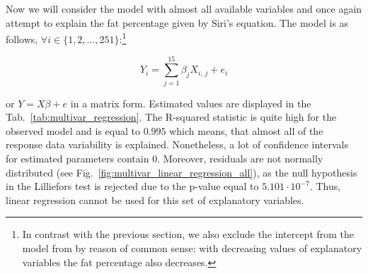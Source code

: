 \documentclass[11pt,american,american]{article}
\begin{document}
Now we will consider the model with almost all available variables and once again attempt to explain the fat percentage given by Siri's equation. The model is as follows, $\forall i \in \{1,2, \dots, 251\}$:\footnote{In contrast with the previous section, we also exclude the intercept from the model from by reason of common sense: with decreasing values of explanatory variables the fat percentage also decreases.}

\begin{equation}
	Y_{i} = \sum_{j = 1}^{15}\beta_{j} X_{i,\,j} + e_{i}
\end{equation}

\medskip
\noindent
or $Y = X \beta + e$ in a matrix form. Estimated values are displayed in the Tab.~\ref{tab:multivar_regression}. The R-squared statistic is quite high for the observed model and is equal to $0.995$ which means, that almost all of the response data variability is explained. Nonetheless, a lot of confidence intervals for estimated parameters contain $0$. Moreover, residuals are not normally distributed (see Fig.~\ref{fig:multivar_linear_regression_all}), as the null hypothesis in the Lilliefors test is rejected due to the p-value equal to $5.101 \cdot 10^{-7}$. Thus, linear regression cannot be used for this set of explanatory variables.
\end{document}
